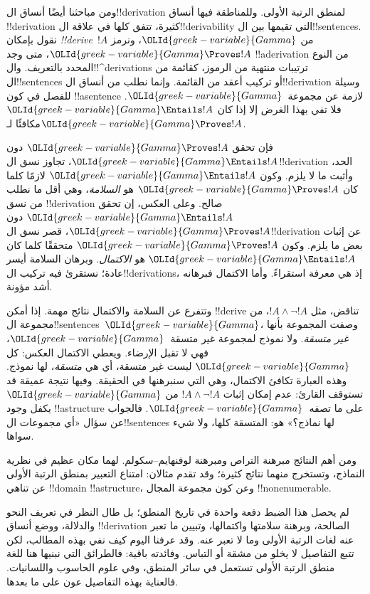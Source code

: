 \documentclass[../../../include/open-logic-section]{subfiles}
\begin{document}


ومن مباحثنا أيضًا أنساق ال!!{derivation} لمنطق الرتبة الأولى.
وللمناطقة فيها أنساق !!{derivation} كثيرة، تتفق كلها في علاقة
ال!!{derivability} التي تقيمها بين ال!!{sentence}s. نقول بإمكان
\emph{!!{derive}}~$!A$ من ${\OLId{greek-variable}{Gamma}}$، ونرمز
${\OLId{greek-variable}{Gamma}} \Proves !A$، متى وجد !!a{derivation} من النوع المحدد
بالتعريف. وال!!^{derivation}s ترتيبات منتهية من الرموز، كقائمة من
ال!!{sentence}s أو تركيب أعقد من القائمة. وإنما نطلب من أنساق
ال!!{derivation} وسيلة للفصل في كون !!a{sentence} لازمة عن
مجموعة~${\OLId{greek-variable}{Gamma}}$. فلا تفي بهذا الغرض إلا إذا كان
${\OLId{greek-variable}{Gamma}} \Entails !A$ مكافئًا لـ${\OLId{greek-variable}{Gamma}} \Proves !A$.

فإن تحقق ${\OLId{greek-variable}{Gamma}} \Proves !A$ دون ${\OLId{greek-variable}{Gamma}} \Entails !A$،
تجاوز نسق ال!!{derivation} الحد، وأثبت ما لا يلزم.
وكون ${\OLId{greek-variable}{Gamma}} \Entails !A$ لازمًا كلما كان
${\OLId{greek-variable}{Gamma}} \Proves !A$ هو \emph{السلامة}، وهي أقل ما نطلب من
نسق !!{derivation} صالح. وعلى العكس، إن تحقق
${\OLId{greek-variable}{Gamma}} \Entails !A$ دون ${\OLId{greek-variable}{Gamma}} \Proves !A$، قصر نسق
ال!!{derivation} عن إثبات بعض ما يلزم. وكون
${\OLId{greek-variable}{Gamma}} \Proves !A$ متحققًا كلما كان ${\OLId{greek-variable}{Gamma}} \Entails !A$
هو \emph{الاكتمال}. وبرهان السلامة أيسر عادة؛ نستقرئ فيه تركيب
ال!!{derivation}s، إذ هي معرفة استقراءً. وأما الاكتمال فبرهانه
أشد مؤونة.

وتتفرع عن السلامة والاكتمال نتائج مهمة. إذا أمكن !!{derive}
تناقض، مثل $!A \land \lnot !A$، من مجموعة ال!!{sentence}s~${\OLId{greek-variable}{Gamma}}$،
وصفت المجموعة بأنها \emph{غير متسقة}. ولا نموذج لمجموعة
غير متسقة~${\OLId{greek-variable}{Gamma}}$، فهي لا تقبل الإرضاء. ويعطي الاكتمال
العكس: كل ${\OLId{greek-variable}{Gamma}}$ ليست غير متسقة، أي هي \emph{متسقة}،
لها نموذج. وهذه العبارة تكافئ الاكتمال، وهي التي سنبرهنها
في الحقيقة. وفيها نتيجة عميقة قد تستوقف القارئ: عدم إمكان إثبات
$!A \land \lnot !A$ من ${\OLId{greek-variable}{Gamma}}$ يكفل وجود
!!a{structure} على ما تصفه~${\OLId{greek-variable}{Gamma}}$.
فالجواب عن سؤال «أي مجموعات ال!!{sentence}s لها نماذج؟»
هو: المتسقة كلها، ولا شيء سواها.

ومن أهم النتائج مبرهنة التراص ومبرهنة لوفنهايم--سكولم. لهما
مكان عظيم في نظرية النماذج، وتستخرج منهما نتائج كثيرة؛ وقد
تقدم مثالان: امتناع التعبير بمنطق الرتبة الأولى عن تناهي
!!{domain} !!a{structure}، وعن كون مجموعة المجال
!!{nonenumerable}.

لم يحصل هذا الضبط دفعة واحدة في تاريخ المنطق؛ بل طال النظر
في تعريف النحو والدلالة، ووضع أنساق !!{derivation} الصالحة،
وبرهنة سلامتها واكتمالها، وتبيين ما تعبر عنه لغات الرتبة الأولى
وما لا تعبر عنه. وقد عرفنا اليوم كيف نفي بهذه المطالب،
لكن تتبع التفاصيل لا يخلو من مشقة أو التباس. وفائدته باقية:
فالطرائق التي نبنيها هنا للغة منطق الرتبة الأولى تستعمل في
سائر المنطق، وفي علوم الحاسوب واللسانيات. فالعناية بهذه
التفاصيل عون على ما بعدها.
\end{document}
